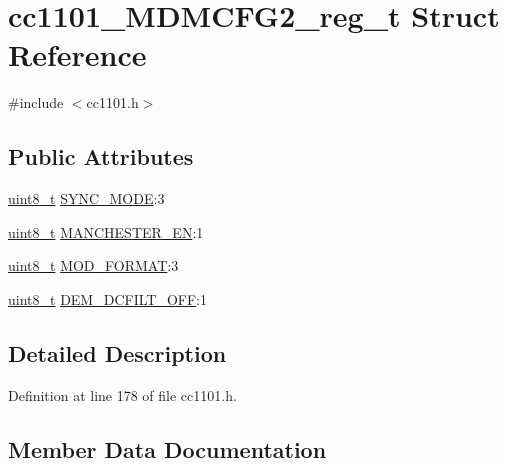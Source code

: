 \hypertarget{structcc1101___m_d_m_c_f_g2__reg__t}{}\section{cc1101\+\_\+\+M\+D\+M\+C\+F\+G2\+\_\+reg\+\_\+t Struct Reference}
\label{structcc1101___m_d_m_c_f_g2__reg__t}


{\ttfamily \#include $<$cc1101.\+h$>$}

\subsection*{Public Attributes}
\begin{DoxyCompactItemize}
\item 
\hyperlink{_p_e___types_8h_aba7bc1797add20fe3efdf37ced1182c5}{uint8\+\_\+t} \hyperlink{structcc1101___m_d_m_c_f_g2__reg__t_ac9c472942a256773a5d585c2f99a92cb}{S\+Y\+N\+C\+\_\+\+M\+O\+DE}\+:3
\item 
\hyperlink{_p_e___types_8h_aba7bc1797add20fe3efdf37ced1182c5}{uint8\+\_\+t} \hyperlink{structcc1101___m_d_m_c_f_g2__reg__t_a92c56c2b9008dfe53bda6b23361f6fe5}{M\+A\+N\+C\+H\+E\+S\+T\+E\+R\+\_\+\+EN}\+:1
\item 
\hyperlink{_p_e___types_8h_aba7bc1797add20fe3efdf37ced1182c5}{uint8\+\_\+t} \hyperlink{structcc1101___m_d_m_c_f_g2__reg__t_a4b83a96a1f6584ce8eeac467d8c99b13}{M\+O\+D\+\_\+\+F\+O\+R\+M\+AT}\+:3
\item 
\hyperlink{_p_e___types_8h_aba7bc1797add20fe3efdf37ced1182c5}{uint8\+\_\+t} \hyperlink{structcc1101___m_d_m_c_f_g2__reg__t_ad81d642c0b40b489cf874a3096962a0a}{D\+E\+M\+\_\+\+D\+C\+F\+I\+L\+T\+\_\+\+O\+FF}\+:1
\end{DoxyCompactItemize}


\subsection{Detailed Description}


Definition at line 178 of file cc1101.\+h.



\subsection{Member Data Documentation}
